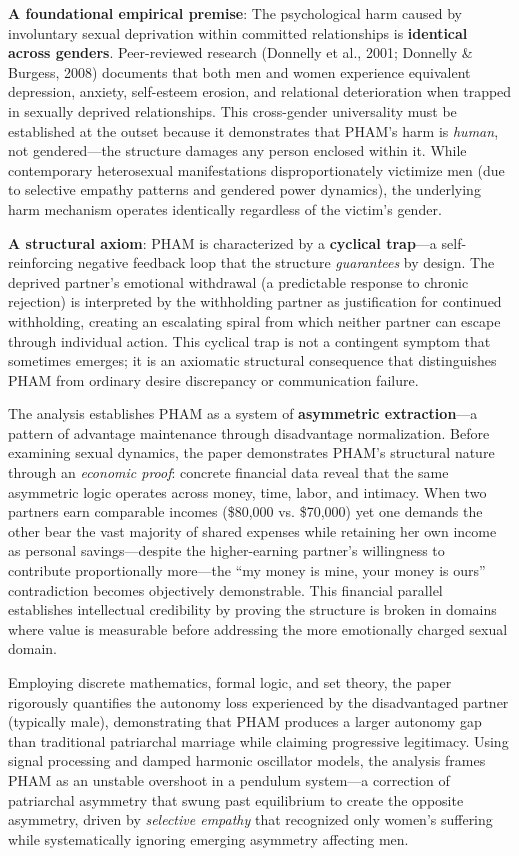 \documentclass[12pt, letterpaper]{article}
\begin{document}
\textbf{A foundational empirical premise}: The psychological harm caused by involuntary sexual deprivation within committed relationships is \textbf{identical across genders}. Peer-reviewed research (Donnelly et al., 2001; Donnelly \& Burgess, 2008) documents that both men and women experience equivalent depression, anxiety, self-esteem erosion, and relational deterioration when trapped in sexually deprived relationships. This cross-gender universality must be established at the outset because it demonstrates that PHAM's harm is \textit{human}, not gendered---the structure damages any person enclosed within it. While contemporary heterosexual manifestations disproportionately victimize men (due to selective empathy patterns and gendered power dynamics), the underlying harm mechanism operates identically regardless of the victim's gender.

\textbf{A structural axiom}: PHAM is characterized by a \textbf{cyclical trap}---a self-reinforcing negative feedback loop that the structure \textit{guarantees} by design. The deprived partner's emotional withdrawal (a predictable response to chronic rejection) is interpreted by the withholding partner as justification for continued withholding, creating an escalating spiral from which neither partner can escape through individual action. This cyclical trap is not a contingent symptom that sometimes emerges; it is an axiomatic structural consequence that distinguishes PHAM from ordinary desire discrepancy or communication failure.

The analysis establishes PHAM as a system of \textbf{asymmetric extraction}---a pattern of advantage maintenance through disadvantage normalization. Before examining sexual dynamics, the paper demonstrates PHAM's structural nature through an \textit{economic proof}: concrete financial data reveal that the same asymmetric logic operates across money, time, labor, and intimacy. When two partners earn comparable incomes (\$80,000 vs. \$70,000) yet one demands the other bear the vast majority of shared expenses while retaining her own income as personal savings---despite the higher-earning partner's willingness to contribute proportionally more---the ``my money is mine, your money is ours'' contradiction becomes objectively demonstrable. This financial parallel establishes intellectual credibility by proving the structure is broken in domains where value is measurable before addressing the more emotionally charged sexual domain.

Employing discrete mathematics, formal logic, and set theory, the paper rigorously quantifies the autonomy loss experienced by the disadvantaged partner (typically male), demonstrating that PHAM produces a larger autonomy gap than traditional patriarchal marriage while claiming progressive legitimacy. Using signal processing and damped harmonic oscillator models, the analysis frames PHAM as an unstable overshoot in a pendulum system---a correction of patriarchal asymmetry that swung past equilibrium to create the opposite asymmetry, driven by \textit{selective empathy} that recognized only women's suffering while systematically ignoring emerging asymmetry affecting men.
\end{document}
